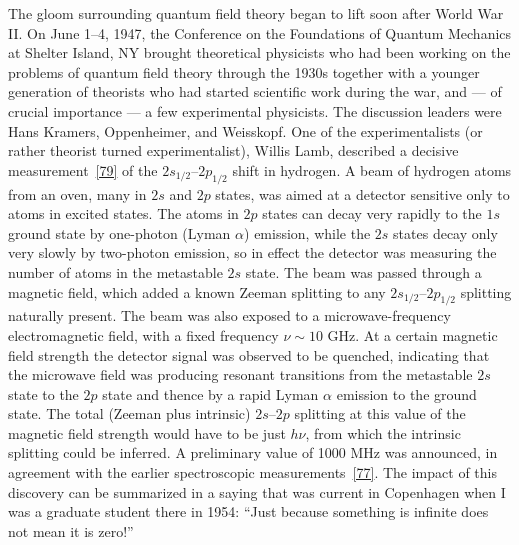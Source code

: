 The gloom surrounding quantum field theory began to lift soon after World War II. On June 1--4, 1947, the Conference on the Foundations of Quantum Mechanics at Shelter Island, NY brought theoretical physicists who had been working on the problems of quantum field theory through the 1930s together with a younger generation of theorists who had started scientific work during the war, and --- of crucial importance --- a few experimental physicists. The discussion leaders were Hans Kramers, Oppenheimer, and Weisskopf. One of the experimentalists (or rather theorist turned experimentalist), Willis Lamb, described a decisive measurement~\hyperref[ref:1.79]{[79]} of the $2s_{1/2}$--$2p_{1/2}$ shift in hydrogen. A beam of hydrogen atoms from an oven, many in $2s$ and $2p$ states, was aimed at a detector sensitive only to atoms in excited states. The atoms in $2p$ states can decay very rapidly to the $1s$ ground state by one-photon (Lyman $\alpha$) emission, while the $2s$ states decay only very slowly by two-photon emission, so in effect the detector was measuring the number of atoms in the metastable $2s$ state. The beam was passed through a magnetic field, which added a known Zeeman splitting to any $2s_{1/2}$--$2p_{1/2}$ splitting naturally present. The beam was also exposed to a microwave-frequency electromagnetic field, with a fixed frequency $\nu\sim10$ GHz. At a certain magnetic field strength the detector signal was observed to be quenched, indicating that the microwave field was producing resonant transitions from the metastable $2s$ state to the $2p$ state and thence by a rapid Lyman $\alpha$ emission to the ground state. The total (Zeeman plus intrinsic) $2s$--$2p$ splitting at this value of the magnetic field strength would have to be just $h\nu$, from which the intrinsic splitting could be inferred. A preliminary value of 1000 MHz was announced, in agreement with the earlier spectroscopic measurements~\hyperref[ref:1.77]{[77]}. The impact of this discovery can be summarized in a saying that was current in Copenhagen when I was a graduate student there in 1954: ``Just because something is infinite does not mean it is zero!''

